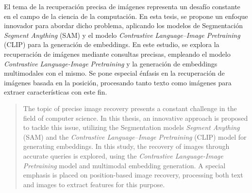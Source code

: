 \begin{resumen}
	El tema de la recuperación precisa de imágenes representa un desafío constante en el campo de la ciencia de la computación. En esta tesis, se propone un enfoque innovador para abordar dicho problema, aplicando los modelos de Segmentación \textit{Segment Anything} (SAM) y el modelo \textit{Contrastive Language–Image Pretraining} (CLIP) para la generación de embeddings. En este estudio, se explora la recuperación de imágenes mediante consultas precisas, empleando el modelo \textit{Contrastive Language-Image Pretraining} y la generación de embeddings multimodales con el mismo. Se pone especial énfasis en la recuperación de imágenes basada en la posición, procesando tanto texto como imágenes para extraer características con este fin.
	 
	\end{resumen}
	
	\begin{abstract}
	The topic of precise image recovery presents a constant challenge in the field of computer science. In this thesis, an innovative approach is proposed to tackle this issue, utilizing the Segmentation models \textit{Segment Anything} (SAM) and the \textit{Contrastive Language–Image Pretraining} (CLIP) model for generating embeddings. In this study, the recovery of images through accurate queries is explored, using the \textit{Contrastive Language-Image Pretraining} model and multimodal embedding generation. A special emphasis is placed on position-based image recovery, processing both text and images to extract features for this purpose.
	\end{abstract}